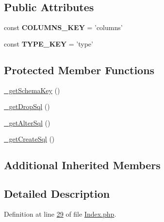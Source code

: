 \subsection*{Public Attributes}
\begin{DoxyCompactItemize}
\item 
\hypertarget{classZendDbSchema__Db__Schema__Table__Index_a8745855c30bb479494164545bfafa066}{const {\bfseries C\-O\-L\-U\-M\-N\-S\-\_\-\-K\-E\-Y} = 'columns'}\label{classZendDbSchema__Db__Schema__Table__Index_a8745855c30bb479494164545bfafa066}

\item 
\hypertarget{classZendDbSchema__Db__Schema__Table__Index_a8ec7e7326231cb03fdb026e6775e5a21}{const {\bfseries T\-Y\-P\-E\-\_\-\-K\-E\-Y} = 'type'}\label{classZendDbSchema__Db__Schema__Table__Index_a8ec7e7326231cb03fdb026e6775e5a21}

\end{DoxyCompactItemize}
\subsection*{Protected Member Functions}
\begin{DoxyCompactItemize}
\item 
\hyperlink{classZendDbSchema__Db__Schema__Table__Index_acadc9fd04b980a4d82a4b9243f32943d}{\-\_\-get\-Schema\-Key} ()
\item 
\hyperlink{classZendDbSchema__Db__Schema__Table__Index_adc6b5ff31c7e12a81b902493186f5758}{\-\_\-get\-Drop\-Sql} ()
\item 
\hyperlink{classZendDbSchema__Db__Schema__Table__Index_ab87e33f2415eaf43730ca6d43ec540b6}{\-\_\-get\-Alter\-Sql} ()
\item 
\hyperlink{classZendDbSchema__Db__Schema__Table__Index_afec61cbe6c22bd42e30103bc3d37ef2d}{\-\_\-get\-Create\-Sql} ()
\end{DoxyCompactItemize}
\subsection*{Additional Inherited Members}


\subsection{Detailed Description}


Definition at line \hyperlink{Db_2Schema_2Table_2Index_8php_source_l00029}{29} of file \hyperlink{Db_2Schema_2Table_2Index_8php_source}{Index.\-php}.




